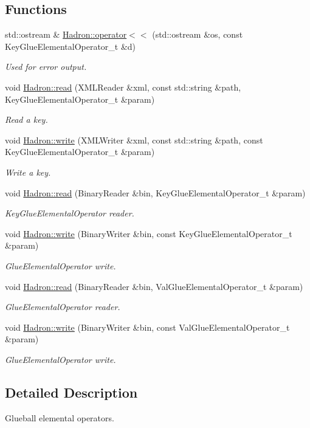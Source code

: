 \subsection*{Functions}
\begin{DoxyCompactItemize}
\item 
std\+::ostream \& \mbox{\hyperlink{namespaceHadron_a04ae91286afb27f277e2c61cd6a77b8a}{Hadron\+::operator$<$$<$}} (std\+::ostream \&os, const Key\+Glue\+Elemental\+Operator\+\_\+t \&d)
\begin{DoxyCompactList}\small\item\em Used for error output. \end{DoxyCompactList}\item 
void \mbox{\hyperlink{namespaceHadron_a0651834c5f37836ea0e1e081b4214546}{Hadron\+::read}} (X\+M\+L\+Reader \&xml, const std\+::string \&path, Key\+Glue\+Elemental\+Operator\+\_\+t \&param)
\begin{DoxyCompactList}\small\item\em Read a key. \end{DoxyCompactList}\item 
void \mbox{\hyperlink{namespaceHadron_a4ae7852bf18d56cb1a966ce318245ea6}{Hadron\+::write}} (X\+M\+L\+Writer \&xml, const std\+::string \&path, const Key\+Glue\+Elemental\+Operator\+\_\+t \&param)
\begin{DoxyCompactList}\small\item\em Write a key. \end{DoxyCompactList}\item 
void \mbox{\hyperlink{namespaceHadron_a008c27a4777be30324acc6271e059d2e}{Hadron\+::read}} (Binary\+Reader \&bin, Key\+Glue\+Elemental\+Operator\+\_\+t \&param)
\begin{DoxyCompactList}\small\item\em Key\+Glue\+Elemental\+Operator reader. \end{DoxyCompactList}\item 
void \mbox{\hyperlink{namespaceHadron_a91e2c5264aeab6dfb2be779cf7140626}{Hadron\+::write}} (Binary\+Writer \&bin, const Key\+Glue\+Elemental\+Operator\+\_\+t \&param)
\begin{DoxyCompactList}\small\item\em Glue\+Elemental\+Operator write. \end{DoxyCompactList}\item 
void \mbox{\hyperlink{namespaceHadron_a9991ac06f4136479286a214307cd17dc}{Hadron\+::read}} (Binary\+Reader \&bin, Val\+Glue\+Elemental\+Operator\+\_\+t \&param)
\begin{DoxyCompactList}\small\item\em Glue\+Elemental\+Operator reader. \end{DoxyCompactList}\item 
void \mbox{\hyperlink{namespaceHadron_aee7b5924c79af024abb8c3d99f7e8b34}{Hadron\+::write}} (Binary\+Writer \&bin, const Val\+Glue\+Elemental\+Operator\+\_\+t \&param)
\begin{DoxyCompactList}\small\item\em Glue\+Elemental\+Operator write. \end{DoxyCompactList}\end{DoxyCompactItemize}


\subsection{Detailed Description}
Glueball elemental operators. 

